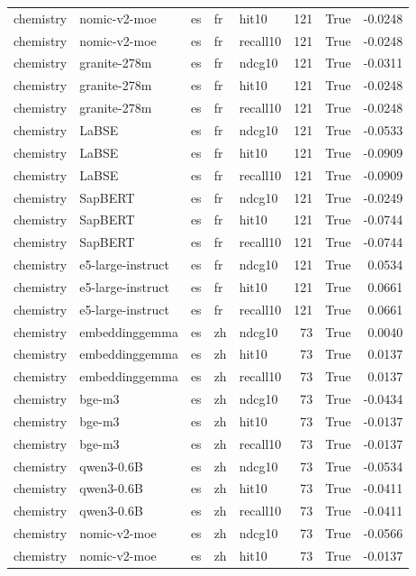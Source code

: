 \begin{tabular}{lllllrrr}
chemistry & nomic-v2-moe & es & fr & hit10 & 121 & True & -0.0248 \\
chemistry & nomic-v2-moe & es & fr & recall10 & 121 & True & -0.0248 \\
chemistry & granite-278m & es & fr & ndcg10 & 121 & True & -0.0311 \\
chemistry & granite-278m & es & fr & hit10 & 121 & True & -0.0248 \\
chemistry & granite-278m & es & fr & recall10 & 121 & True & -0.0248 \\
chemistry & LaBSE & es & fr & ndcg10 & 121 & True & -0.0533 \\
chemistry & LaBSE & es & fr & hit10 & 121 & True & -0.0909 \\
chemistry & LaBSE & es & fr & recall10 & 121 & True & -0.0909 \\
chemistry & SapBERT & es & fr & ndcg10 & 121 & True & -0.0249 \\
chemistry & SapBERT & es & fr & hit10 & 121 & True & -0.0744 \\
chemistry & SapBERT & es & fr & recall10 & 121 & True & -0.0744 \\
chemistry & e5-large-instruct & es & fr & ndcg10 & 121 & True & 0.0534 \\
chemistry & e5-large-instruct & es & fr & hit10 & 121 & True & 0.0661 \\
chemistry & e5-large-instruct & es & fr & recall10 & 121 & True & 0.0661 \\
chemistry & embeddinggemma & es & zh & ndcg10 & 73 & True & 0.0040 \\
chemistry & embeddinggemma & es & zh & hit10 & 73 & True & 0.0137 \\
chemistry & embeddinggemma & es & zh & recall10 & 73 & True & 0.0137 \\
chemistry & bge-m3 & es & zh & ndcg10 & 73 & True & -0.0434 \\
chemistry & bge-m3 & es & zh & hit10 & 73 & True & -0.0137 \\
chemistry & bge-m3 & es & zh & recall10 & 73 & True & -0.0137 \\
chemistry & qwen3-0.6B & es & zh & ndcg10 & 73 & True & -0.0534 \\
chemistry & qwen3-0.6B & es & zh & hit10 & 73 & True & -0.0411 \\
chemistry & qwen3-0.6B & es & zh & recall10 & 73 & True & -0.0411 \\
chemistry & nomic-v2-moe & es & zh & ndcg10 & 73 & True & -0.0566 \\
chemistry & nomic-v2-moe & es & zh & hit10 & 73 & True & -0.0137 \\

\end{tabular}
